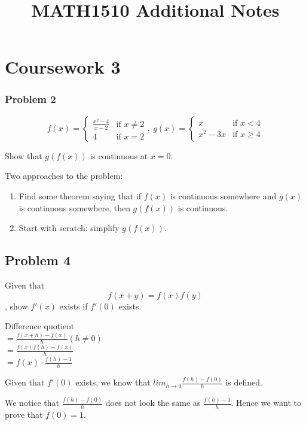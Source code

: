 \documentclass{article}
\title{MATH1510 Additional Notes}
\author{}
\date{}
\begin{document}
\section{Coursework 3}

\subsubsection{Problem 2}

$$
f(x) = \begin{cases}
  \frac{x^2-4}{x-2} & \text{if } x \not = 2\\
  4 & \text{if } x = 2
\end{cases},\ 
g(x) = \begin{cases}
  x & \text{if } x < 4\\
  x^2 - 3x & \text{if } x \geq 4
\end{cases}
$$

Show that $g(f(x))$ is continuous at $x = 0$.

Two approaches to the problem:

\begin{enumerate}
  \item Find some theorem saying that if $f(x)$ is continuous somewhere and $g(x)$ is continuous somewhere, then $g(f(x))$ is continuous.
  \item Start with scratch: simplify $g(f(x))$.
\end{enumerate}

\subsection{Problem 4}

Given that $$f(x + y) = f(x)f(y)$$, show $f'(x)$ exists if $f'(0)$ exists.

Difference quotient\\
$ = \frac{f(x + h) - f(x)}{h} (h \not = 0) $\\
$ = \frac{f(x)f(h) - f(x)}{h} $\\
$ = f(x) \cdot \frac{f(h) - 1}{h} $

Given that $f'(0)$ exists, we know that $lim_{h \to 0} \frac{f(h) - f(0)}{h}$ is defined.

We notice that $\frac{f(h) - f(0)}{h}$ does not look the same as $\frac{f(h) - 1}{h}$. Hence we want to prove that $f(0) = 1$.
\end{document}
